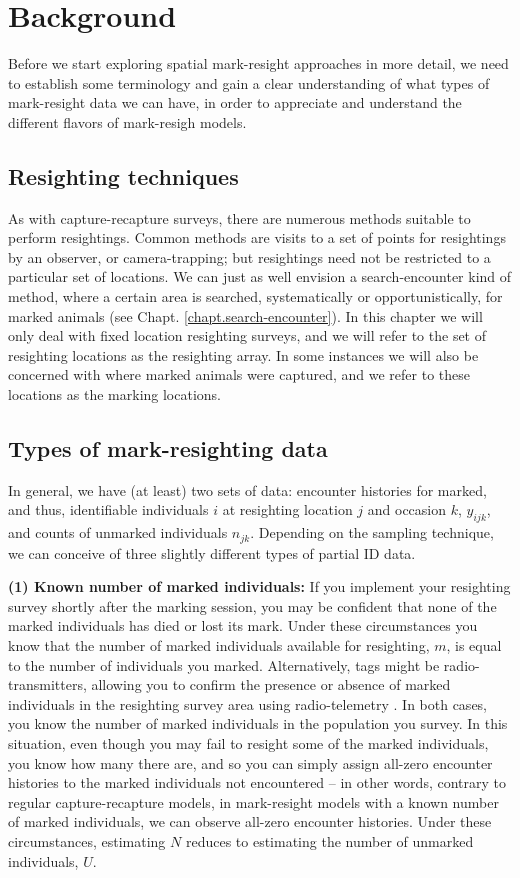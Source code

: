 \section{Background}
Before we start exploring spatial mark-resight approaches in more detail, we
need to establish some terminology and gain a clear understanding of what types of mark-resight data we can
have, in order to appreciate and understand the different flavors of
mark-resigh models.

\subsection{Resighting techniques}
As with capture-recapture surveys, there
are numerous
methods suitable to perform resightings. Common methods are visits to a set of points for resightings by an observer, or camera-trapping; but resightings need not be restricted to a particular set of locations. We can just as well envision a search-encounter kind of method, where a certain area is searched, systematically or opportunistically, for marked animals (see Chapt. \ref{chapt.search-encounter}). In this chapter we will only deal with fixed location resighting surveys, and we will refer to the set of resighting locations as the resighting array. In some instances we will also be concerned with where marked animals were captured, and we refer to these locations as the marking locations.

\subsection{Types of mark-resighting data}

In general, we have (at least) two sets of data:
encounter histories for marked, and thus,
identifiable
individuals $i$ at resighting location $j$ and
occasion $k$, $y_{ijk}$, and counts of
unmarked individuals %
$n_{jk}$.
Depending on the sampling technique, we can
conceive of three slightly different types of partial ID data.


\textbf{(1) Known number of marked individuals:}
If you implement your resighting survey shortly after the marking
session, you may be confident that none of the marked individuals has
died
or lost its mark. Under these circumstances you know that the
number of marked individuals available for resighting, $m$, is equal
to the number of individuals you marked. Alternatively, tags might be
radio-transmitters, allowing you to confirm the presence or absence of
marked individuals in the resighting survey area using radio-telemetry
\citep{white_shenk:2001}. In both cases, you know the number of marked
individuals in the population you survey.
In this situation, even though you may fail to resight some of the
marked individuals, %
you know how many there are,
and so
you can simply
assign %
all-zero encounter histories
to the marked individuals not encountered
-- in other
words, contrary to regular capture-recapture models, in mark-resight
models with a known number of marked individuals, we can observe
all-zero encounter histories. Under these circumstances, estimating
$N$ reduces to estimating the number of unmarked individuals, $U$.

